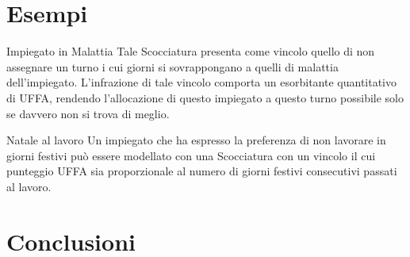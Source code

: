 \documentclass[compress]{beamer}
\begin{document}
\section{Esempi}
\begin{frame}{\secname}
    \begin{exampleblock}{Impiegato in Malattia}
        Tale Scocciatura presenta come vincolo quello di non assegnare un turno i cui
        giorni si sovrappongano a quelli di malattia dell'impiegato. L'infrazione di
        tale vincolo comporta un esorbitante quantitativo di UFFA, rendendo
        l'allocazione di questo impiegato a questo turno possibile solo se davvero non
        si trova di meglio.
    \end{exampleblock}
\end{frame}
\begin{frame}{\secname}
    \begin{exampleblock}{Natale al lavoro}
        Un impiegato che ha espresso la preferenza di non lavorare in giorni festivi
        può essere modellato con una Scocciatura con un vincolo il cui punteggio UFFA
        sia proporzionale al numero di giorni festivi consecutivi passati al lavoro.
    \end{exampleblock}    
\end{frame}

\section{Conclusioni}
\end{document}
